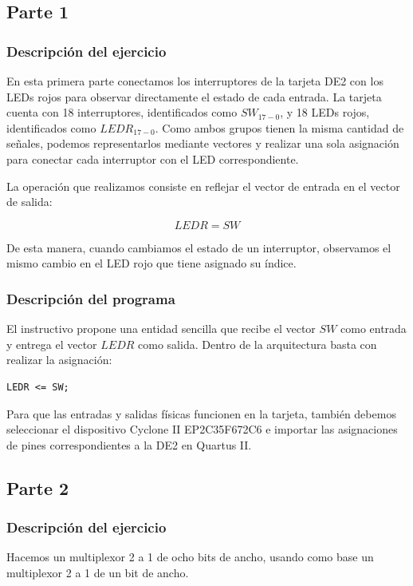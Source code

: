\documentclass[12pt]{report}
\begin{document}
\subsection*{Parte 1}
\subsubsection*{Descripción del ejercicio}
En esta primera parte conectamos los interruptores de la tarjeta DE2 con los LEDs rojos para observar directamente el estado de cada entrada. La tarjeta cuenta con 18 interruptores, identificados como $SW_{17-0}$, y 18 LEDs rojos, identificados como $LEDR_{17-0}$. Como ambos grupos tienen la misma cantidad de señales, podemos representarlos mediante vectores y realizar una sola asignación para conectar cada interruptor con el LED correspondiente.

La operación que realizamos consiste en reflejar el vector de entrada en el vector de salida:

\[
LEDR = SW
\]

De esta manera, cuando cambiamos el estado de un interruptor, observamos el mismo cambio en el LED rojo que tiene asignado su índice.

\subsubsection*{Descripción del programa}
El instructivo propone una entidad sencilla que recibe el vector $SW$ como entrada y entrega el vector $LEDR$ como salida. Dentro de la arquitectura basta con realizar la asignación:

\begin{lstlisting}
LEDR <= SW;
\end{lstlisting}

Para que las entradas y salidas físicas funcionen en la tarjeta, también debemos seleccionar el dispositivo Cyclone II EP2C35F672C6 e importar las asignaciones de pines correspondientes a la DE2 en Quartus II.


\subsection*{Parte 2}
\subsubsection*{Descripción del ejercicio}
Hacemos un multiplexor 2 a 1 de ocho bits de ancho, usando como base un multiplexor 2 a 1 de un bit de ancho.
\end{document}
